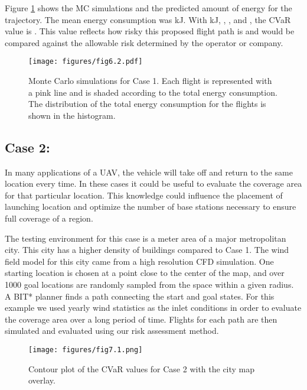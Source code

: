 \documentclass[letterpaper, 10 pt, conference]{ieeeconf}
\begin{document}
Figure \ref{fig:study1} shows the  MC simulations and the predicted amount of energy for the trajectory. The mean energy consumption was  kJ. With  kJ, , , and , the CVaR value is . This value reflects how risky this proposed flight path is and would be compared against the allowable risk determined by the operator or company.





\begin{figure}
    \centering
      \texttt{[image: figures/fig6.2.pdf]}
\caption{Monte Carlo simulations for Case 1. Each flight is represented with a pink line and is shaded according to the total energy consumption. The distribution of the total energy consumption for the flights is shown in the histogram.}
    \label{fig:study1}
\end{figure}
\subsection{Case 2: }
In many applications of a UAV, the vehicle will take off and return to the same location every time. In these cases it could be useful to evaluate the coverage area for that particular location. This knowledge could influence the placement of launching location and optimize the number of base stations necessary to ensure full coverage of a region.

The testing environment for this case is a  meter area of a major metropolitan city. This city has a higher density of buildings compared to Case 1. The wind field model for this city came from a high resolution CFD simulation. One starting location is chosen at a point close to the center of the map, and over 1000 goal locations are randomly sampled from the space within a given radius. A BIT* planner \cite{Gammell_2015} finds a path connecting the start and goal states. For this example we used yearly wind statistics as the inlet conditions in order to evaluate the coverage area over a long period of time. Flights for each path are then simulated and evaluated using our risk assessment method.  


\begin{figure}
    \centering
      \texttt{[image: figures/fig7.1.png]}
    \caption{Contour plot of the CVaR values for Case 2 with the city map overlay.}
    \label{fig:study2}
\end{figure}
\end{document}
